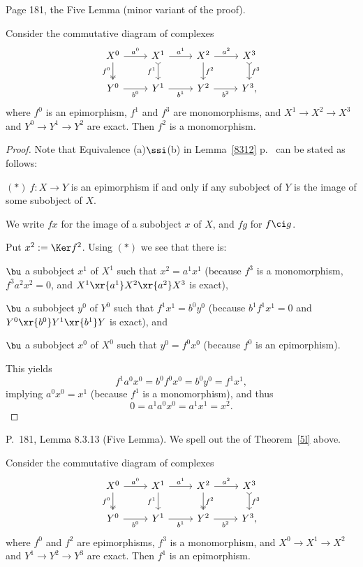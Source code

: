 \documentclass[12pt]{article}
\theoremstyle{remark}
\theoremstyle{definition}
\begin{document}
\begin{s} 
Page 181, the Five Lemma (minor variant of the proof). 

\begin{thm} 
Consider the commutative diagram of complexes 
$$
\begin{tikzcd}
X^0\ar[two heads]{d}[swap]{f^0}\ar{r}{a^0}&
X^1\ar[tail]{d}[swap]{f^1}\ar{r}{a^1}&
X^2\ar{d}{f^2}\ar{r}{a^2}&
X^3\ar[tail]{d}{f^3}\\ 
Y^0\ar{r}[swap]{b^0}&
Y^1\ar{r}[swap]{b^1}&
Y^2\ar{r}[swap]{b^2}&
Y^3,
\end{tikzcd}
$$
where $f^0$ is an epimorphism, $f^1$ and $f^3$ are monomorphisms, and $X^1\to X^2\to X^3$ and $Y^0\to Y^1\to Y^2$ are exact. Then $f^2$ is a monomorphism. 
\end{thm} 

\begin{proof}
Note that Equivalence (a)$\ssi$(b) in Lemma~\ref{8312} p.~ can be stated as follows: 

\nn$(*)\ f:X\to Y$ is an epimorphism if and only if any subobject of $Y$ is the image of some subobject of $X$. 

We write $fx$ for the image of a subobject $x$ of $X$, and $fg$ for $f\ci g$.

Put $x^2:=\Ker f^2$. Using $(*)$ we see that there is: 

\nn$\bu$ a subobject $x^1$ of $X^1$ such that $x^2=a^1x^1$ (because $f^3$ is a monomorphism, $f^3a^2x^2=0$, and $X^1\xr{a^1}X^2\xr{a^2}X^3$ is exact), 

\nn$\bu$ a subobject $y^0$ of $Y^0$ such that $f^1x^1=b^0y^0$ (because $b^1f^1x^1=0$ and $Y^0\xr{b^0}Y^1\xr{b^1}Y$ is exact), and 

\nn$\bu$ a subobject $x^0$ of $X^0$ such that $y^0=f^0x^0$ (because $f^0$ is an epimorphism). 

This yields 
$$
f^1a^0x^0=b^0f^0x^0=b^0y^0=f^1x^1,
$$
implying $a^0x^0=x^1$ (because $f^1$ is a monomorphism), and thus 
$$
0=a^1a^0x^0=a^1x^1=x^2.
$$ 
\end{proof}
\end{s}

%

\begin{s} 
P.~181, Lemma 8.3.13 (Five Lemma). We spell out the  of Theorem~\ref{5l} above.
\begin{thm} 
Consider the commutative diagram of complexes 
$$
\begin{tikzcd}
X^0\ar[two heads]{d}[swap]{f^0}\ar{r}{a^0}&
X^1\ar{d}[swap]{f^1}\ar{r}{a^1}&
X^2\ar[two heads]{d}{f^2}\ar{r}{a^2}&
X^3\ar[tail]{d}{f^3}\\ 
Y^0\ar{r}[swap]{b^0}&
Y^1\ar{r}[swap]{b^1}&
Y^2\ar{r}[swap]{b^2}&
Y^3,
\end{tikzcd}
$$
where $f^0$ and $f^2$ are epimorphisms, $f^3$ is a monomorphism, and $X^0\to X^1\to X^2$ and $Y^1\to Y^2\to Y^3$ are exact. Then $f^1$ is an epimorphism. 
\end{thm}
\end{s}
\end{document}
